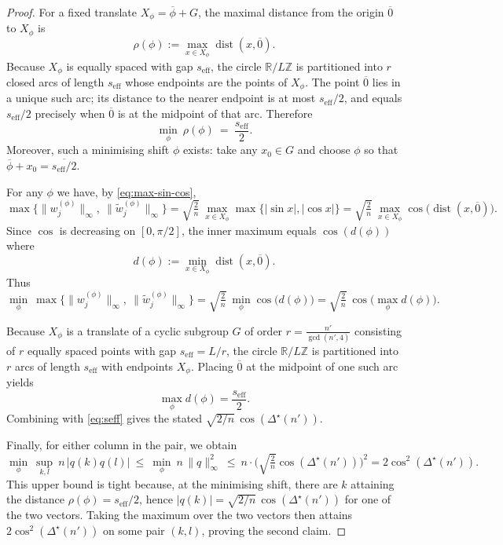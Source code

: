 \documentclass[12pt,fleqn]{amsart}
\renewcommand{\le}{\leqslant}
\theoremstyle{remark}
\newcommand{\1}{\mathbf{1}}
\begin{document}
\begin{proof}
For a fixed translate $X_\phi=\overline{\phi}+G$, the maximal distance from the origin $\overline{0}$ to $X_\phi$ is
\[
\rho(\phi):=\max_{x\in X_\phi}\operatorname{dist}(x,\overline{0}).
\]
Because $X_\phi$ is equally spaced with gap $s_{\mathrm{eff}}$, the circle $\mathbb R/L\mathbb Z$ is partitioned into $r$ closed arcs of length $s_{\mathrm{eff}}$ whose endpoints are the points of $X_\phi$. The point $\overline{0}$ lies in a unique such arc; its distance to the nearer endpoint is at most $s_{\mathrm{eff}}/2$, and equals $s_{\mathrm{eff}}/2$ precisely when $\overline{0}$ is at the midpoint of that arc. Therefore
\begin{equation}\label{eq:radius}
\min_{\phi}\ \rho(\phi)\ =\ \frac{s_{\mathrm{eff}}}{2}.
\end{equation}
Moreover, such a minimising shift $\phi$ exists: take any $x_0\in G$ and choose $\phi$ so that $\overline{\phi}+x_0=\overline{s_{\mathrm{eff}}/2}$.

\smallskip

For any $\phi$ we have, by \eqref{eq:max-sin-cos},
\[
\max\Big\{\|w^{(\phi)}_j\|_\infty,\ \|\tilde w^{(\phi)}_j\|_\infty\Big\}
=\sqrt{\tfrac{2}{n}}\ \max_{x\in X_\phi}\max\{|\sin x|,|\cos x|\}
=\sqrt{\tfrac{2}{n}}\ \max_{x\in X_\phi}\cos\big(\operatorname{dist}(x,\overline{0})\big).
\]
Since $\cos$ is decreasing on $[0,\pi/2]$, the inner maximum equals $\cos(d(\phi))$ where
\[
d(\phi):=\min_{x\in X_\phi}\operatorname{dist}(x,\overline{0}).
\]
Thus
\[
\min_{\phi}\ \max\Big\{\|w^{(\phi)}_j\|_\infty,\ \|\tilde w^{(\phi)}_j\|_\infty\Big\}
=\sqrt{\tfrac{2}{n}}\ \min_{\phi}\cos\big(d(\phi)\big)
=\sqrt{\tfrac{2}{n}}\ \cos\!\Big(\max_{\phi} d(\phi)\Big).
\]

Because $X_\phi$ is a translate of a cyclic subgroup $G$ of order $r=\frac{n'}{\gcd(n',4)}$ consisting of $r$ equally spaced points with gap $s_{\mathrm{eff}}=L/r$, the circle $\mathbb R/L\mathbb Z$ is partitioned into $r$ arcs of length $s_{\mathrm{eff}}$ with endpoints $X_\phi$. Placing $\overline{0}$ at the midpoint of one such arc yields 
\[
\max_\phi d(\phi)=\frac{s_{\mathrm{eff}}}{2}.
\]
Combining with \eqref{eq:seff} gives the stated $\sqrt{2/n}\,\cos(\Delta^\star(n'))$.

Finally, for either column in the pair, we obtain
\[
\min_{\phi}\ \sup_{k,l}\ n\,|q(k)q(l)|
\ \le\ \min_{\phi}\ n\,\|q\|_\infty^2
\ \le\ n\cdot \Big(\sqrt{\tfrac{2}{n}}\cos(\Delta^\star(n'))\Big)^2
=2\cos^2(\Delta^\star(n')).
\]
This upper bound is tight because, at the minimising shift, there are $k$ attaining the distance $\rho(\phi)=s_{\mathrm{eff}}/2$, hence $|q(k)|=\sqrt{2/n}\,\cos(\Delta^\star(n'))$ for one of the two vectors. Taking the maximum over the two vectors then attains $2\cos^2(\Delta^\star(n'))$ on some pair $(k,l)$, proving the second claim.
\end{proof}
\end{document}
